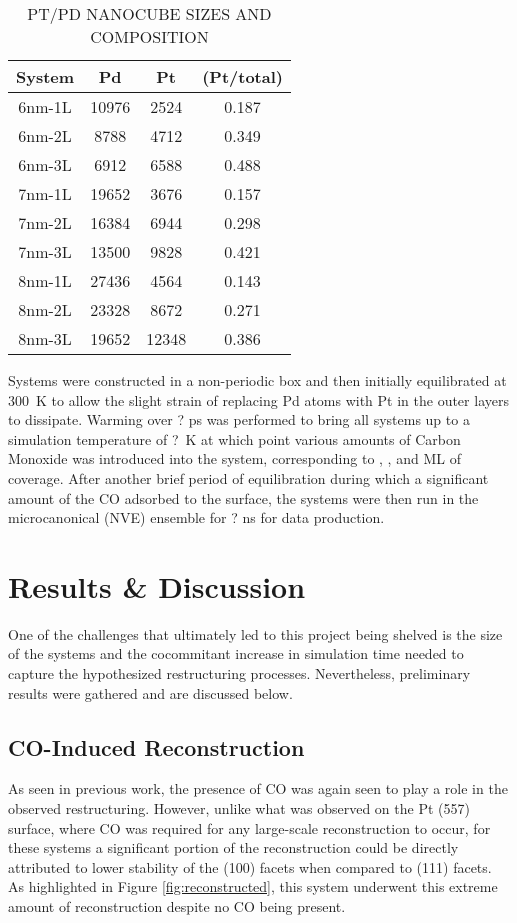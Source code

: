 \begin{table}
  \caption{PT/PD NANOCUBE SIZES AND COMPOSITION}
  \centering
  \begin{threeparttable}
  \begin{tabular}{ c ccc }
  \hline
  \hline
  \textbf{System} & \textbf{Pd} & \textbf{Pt} &  \textbf{(Pt/total)} \\
  \hline
  6nm-1L & 10976 & 2524  & 0.187 \\
  6nm-2L & 8788  & 4712  & 0.349 \\
  6nm-3L & 6912  & 6588  & 0.488 \\
  7nm-1L & 19652 & 3676  & 0.157 \\
  7nm-2L & 16384 & 6944  & 0.298 \\
  7nm-3L & 13500 & 9828  & 0.421 \\
  8nm-1L & 27436 & 4564  & 0.143 \\
  8nm-2L & 23328 & 8672  & 0.271 \\
  8nm-3L & 19652 & 12348 & 0.386 \\
  \hline
  \hline
  \end{tabular}
  \end{threeparttable}
\label{tab:systems}
\end{table}

Systems were constructed in a non-periodic box and then initially equilibrated
at 300~K to allow the slight strain of replacing Pd atoms with Pt in the outer
layers to dissipate. Warming over ? ps was performed to bring all systems up to
a simulation temperature of ?~K at which point various amounts of Carbon
Monoxide was introduced into the system, corresponding to , , and ML of
coverage. After another brief period of equilibration during which a
significant amount of the CO adsorbed to the surface, the systems were then run
in the microcanonical (NVE) ensemble for ? ns for data production.

\section{Results \& Discussion}
One of the challenges that ultimately led to this project being shelved is the
size of the systems and the cocommitant increase in simulation time needed to
capture the hypothesized restructuring processes. Nevertheless, preliminary
results were gathered and are discussed below.

\subsection{CO-Induced Reconstruction}
As seen in previous work\citep{}, the presence of CO was again seen to play a
role in the observed restructuring. However, unlike what was observed on the Pt
(557) surface\citep{}, where CO was required for any large-scale reconstruction
to occur, for these systems a significant portion of the reconstruction could
be directly attributed to lower stability of the (100) facets when compared to
(111) facets. As highlighted in Figure \ref{fig:reconstructed}, this system
underwent this extreme amount of reconstruction despite no CO being present. 

